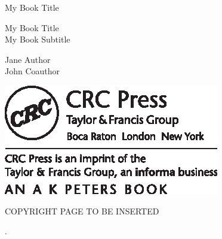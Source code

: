 \vspace*{1in}

 \begin{flushright}
 \setlength{\baselineskip}{30pt}
 {\MTSMALL My Book Title}
 \end{flushright}

\newpage

\phantom{Xx}

\newpage


 \begin{flushright}
 \setlength{\baselineskip}{36pt}
 {{\MT My Book Title}\\{\MTSUB My Book Subtitle}}

\vspace{1in}

 \setlength{\baselineskip}{22pt}
 {\MTA Jane Author\\ John Coauthor}

\vfill

\includegraphics{AKPeters_TitlePageLogo.eps}

 \end{flushright}

\newpage

COPYRIGHT PAGE TO BE INSERTED

\newpage


\vspace*{1in}


\begin{flushright}
 \setlength{\baselineskip}{13.5pt}
{\MTD [DEDICATION].}
\end{flushright}

\newpage
\strut
